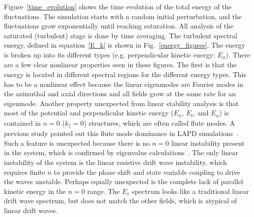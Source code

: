 \documentclass[showpacs,preprintnumbers,amsmath,amssymb,superscriptaddress]{revtex4}
\def\para{\parallel}
\begin{document}
Figure~\ref{time_evolution} shows the time evolution of the total energy of the fluctuations. The simulation starts with a random initial perturbation, and the fluctuations grow
exponentially until reaching saturation. All analysis of the saturated (turbulent) stage is done by time averaging.
The turbulent spectral energy, defined in equation~\ref{E_k} is shown in Fig.~\ref{energy_figures}. The energy is broken up into its different types (e.g. perpendicular kinetic energy: $E_\phi$).
There are a few clear nonlinear properties
seen in these figures. The first is that the energy is located in different spectral regions for the different energy types. This has to be a nonlinear effect because the linear eigenmodes
are Fourier modes in the azimuthal and axial directions and all fields grow at the same rate for an eigenmode. 
Another property unexpected from linear stability analysis is that most of the potential and perpendicular kinetic energy ($E_n$, $E_t$, and $E_\phi$) is contained in $n=0$ ($k_\para = 0$) 
structures, which are often called flute modes. A previous study pointed out this flute mode dominance in LAPD simulations~\cite{Umansky2011}.
Such a feature is unexpected because there is no $n=0$ linear instability present in the system, which is confirmed by eigenvalue calculations~\cite{Popovich2010a}.
The only linear instability of the system is the
linear resistive drift wave instability, which requires finite $n$ to provide the phase shift and state variable coupling to drive the waves unstable. Perhaps equally unexpected is the complete
lack of parallel kinetic energy in the $n=0$ range. The $E_v$ spectrum looks like a traditional linear drift wave spectrum, but does not match the other fields, which is atypical of
linear drift waves.

\end{document}
